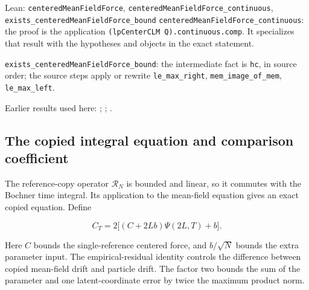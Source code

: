 \documentclass[11pt,a4paper]{report}
\begin{document}
\begin{leanbox}{Lean: \texttt{centeredMeanFieldForce}, \texttt{centeredMeanFieldForce\_\allowbreak{}continuous}, \texttt{exists\_\allowbreak{}centeredMeanFieldForce\_\allowbreak{}bound}}
\texttt{centered\allowbreak{}Mean\allowbreak{}Field\allowbreak{}Force\_\allowbreak{}continuous}: the proof is the application \texttt{(lp\allowbreak{}Center\allowbreak{}CLM Q).\allowbreak{}continuous.\allowbreak{}comp}. It specializes that result with the hypotheses and objects in the exact statement.



\texttt{exists\_\allowbreak{}centered\allowbreak{}Mean\allowbreak{}Field\allowbreak{}Force\_\allowbreak{}bound}: the intermediate fact is \texttt{hc}, in source order; the source steps apply or rewrite \texttt{le\_\allowbreak{}max\_\allowbreak{}right}, \texttt{mem\_\allowbreak{}image\_\allowbreak{}of\_\allowbreak{}mem}, \texttt{le\_\allowbreak{}max\_\allowbreak{}left}.
\end{leanbox}


Earlier results used here: \cite[Section~3.13.2]{LangevinLean2026ULASC}; \cite[Section~3.13.5]{LangevinLean2026ULASC}; \cite[Section~3.1.1]{LangevinLean2026IPLA}.
\subsection{\texorpdfstring{The copied integral equation and comparison coefficient}{The copied integral equation and comparison coefficient}}
\label{report-step-ProximalLangevin-MeanFieldParticles-lean-2}


The reference-copy operator \(\mathcal R_N\) is bounded and linear, so it commutes with the Bochner time integral. Its application to the mean-field equation gives an exact copied equation. Define

\[C_T=2\big[(C+2Lb)\Psi(2L,T)+b\big].\]

Here \(C\) bounds the single-reference centered force, and \(b/\sqrt N\) bounds the extra parameter input. The empirical-residual identity controls the difference between copied mean-field drift and particle drift. The factor two bounds the sum of the parameter and one latent-coordinate error by twice the maximum product norm.
\end{document}
